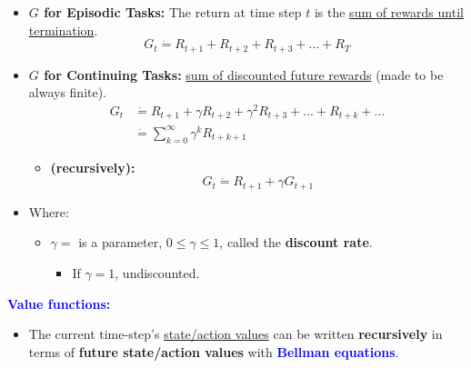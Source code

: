 \documentclass[12pt, a4paper]{article}
\begin{document}
\begin{itemize}
  \item \textbf{$G$ for Episodic Tasks:} The return at time step $t$ is the \uline{sum of rewards until termination}.
  $$
  G_t \dot{=} R_{t+1} + R_{t+2} + R_{t+3} + ... + R_T
  $$
  \item \textbf{$G$ for Continuing Tasks:} \uline{sum of discounted future rewards} (made to be always finite).
  \begin{align*}
    G_t &\dot{=} R_{t+1} + \gamma R_{t+2} + \gamma^2 R_{t+3} + ... + R_{t+k} + ... \\
    &\dot{=} \sum_{k=0}^{\infty} \gamma^k R_{t+k+1}
  \end{align*}
  \begin{itemize}
    \item \textbf{(recursively):}
    $$
    G_t \dot{=} R_{t+1} + \gamma G_{t+1}
    $$
  \end{itemize}
  \item Where:
  \begin{itemize}
    \item
      \(\gamma =\) is a parameter, \(0 \leq \gamma \leq 1\), called the
      \textbf{discount rate}.
      \begin{itemize}
        \item If $\gamma = 1$, undiscounted.
      \end{itemize}
  \end{itemize}
\end{itemize}





\textcolor{blue}{\textbf{Value functions:}}

\begin{itemize}
  \item The current time-step's \uline{state/action values} can be written \textbf{recursively} in terms of \textbf{future state/action values} with \textcolor{blue}{\textbf{Bellman equations}}.
\end{itemize}
\end{document}
